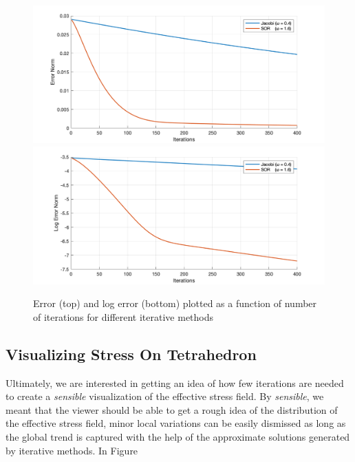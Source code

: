 \documentclass[11pt,titlepage]{article}
\begin{document}
\begin{figure}[!htbp]
    \begin{center}
        \includegraphics[width=\textwidth]{archbridge_tiny_errornorm.png}
        \includegraphics[width=\textwidth]{archbridge_tiny_logerrornorm.png}
        \caption{\label{fig:3} Error (top) and log error (bottom) plotted as a function of number of iterations for different iterative methods}
    \end{center}
\end{figure}

\subsection{Visualizing Stress On Tetrahedron}

Ultimately, we are interested in getting an idea of how few iterations are needed to create a \textit{sensible} visualization of the effective stress field. By \textit{sensible}, we meant that the viewer should be able to get a rough idea of the distribution of the effective stress field, minor local variations can be easily dismissed as long as the global trend is captured with the help of the approximate solutions generated by iterative methods. In Figure~\
\end{document}
